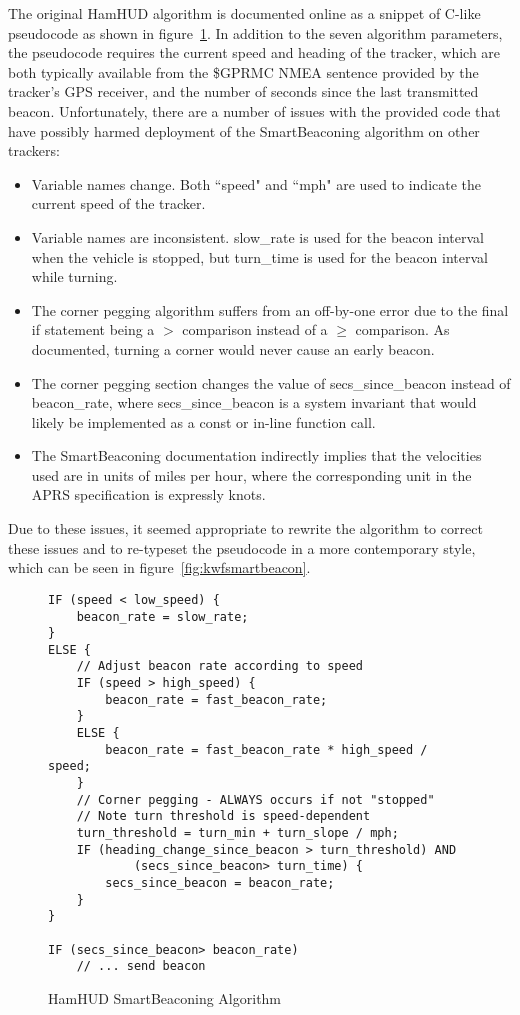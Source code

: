 The original HamHUD algorithm is documented online as a snippet of C-like 
pseudocode as shown in figure~\ref{fig:hamhudsmartbeacon}.
In addition to the seven algorithm parameters, the pseudocode
requires the current speed and heading of the tracker, which are both
typically available from the \$GPRMC NMEA sentence \cite{nmearmc} provided by the 
tracker's GPS receiver, and the number of seconds since the last transmitted beacon.
Unfortunately, there are a number of issues with the provided code that
have possibly harmed deployment of the SmartBeaconing algorithm on other trackers:
\begin{itemize}
	\item Variable names change. Both ``speed" and ``mph" are used 
		to indicate the current speed of the tracker.
	\item Variable names are inconsistent. slow\_rate is used for the 
		beacon interval when the vehicle is stopped, but turn\_time is used
		for the beacon interval while turning.
	\item The corner pegging algorithm suffers from an off-by-one error due to
		the final if statement being a $>$ comparison instead
		of a $\geq$ comparison. As documented, turning a corner would
		never cause an early beacon.
	\item The corner pegging section changes the value of secs\_since\_beacon
		instead of beacon\_rate, where secs\_since\_beacon is a system
		invariant that would likely be implemented as a const
		or in-line function call.
	\item The SmartBeaconing documentation indirectly implies that 
		the velocities used are in units
		of miles per hour, where the corresponding unit in the APRS
		specification is expressly knots.
\end{itemize}

Due to these issues, it seemed appropriate to rewrite the algorithm 
to correct these issues and to re-typeset the pseudocode in a more
contemporary style, which can be seen in figure~\ref{fig:kwfsmartbeacon}.

\begin{figure}[p]
\begin{lstlisting}
IF (speed < low_speed) {
	beacon_rate = slow_rate;
}
ELSE {
	// Adjust beacon rate according to speed
	IF (speed > high_speed) {
		beacon_rate = fast_beacon_rate;
	}
	ELSE {
		beacon_rate = fast_beacon_rate * high_speed / speed;
	}
	// Corner pegging - ALWAYS occurs if not "stopped"
	// Note turn threshold is speed-dependent
	turn_threshold = turn_min + turn_slope / mph;
	IF (heading_change_since_beacon > turn_threshold) AND
			(secs_since_beacon> turn_time) {
		secs_since_beacon = beacon_rate;
	}
}

IF (secs_since_beacon> beacon_rate)
	// ... send beacon
\end{lstlisting}
\caption{HamHUD SmartBeaconing Algorithm}
\label{fig:hamhudsmartbeacon}
\end{figure}

